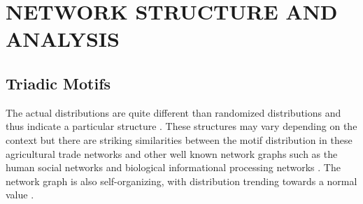 \chapter{NETWORK STRUCTURE AND ANALYSIS}
\label{networkAnalysisChapter}
\section{Triadic Motifs}
The actual distributions are quite different than randomized distributions and thus indicate a particular structure \citep{milo2002network}. These structures may vary depending on the context but there are striking similarities between the motif distribution in these agricultural trade networks and other well known network graphs such as the human social networks and biological informational processing networks \citep{shutters2012agricultural}. The network graph is also self-organizing, with distribution trending towards a normal value \citep{squartini2012triadic}.\par

